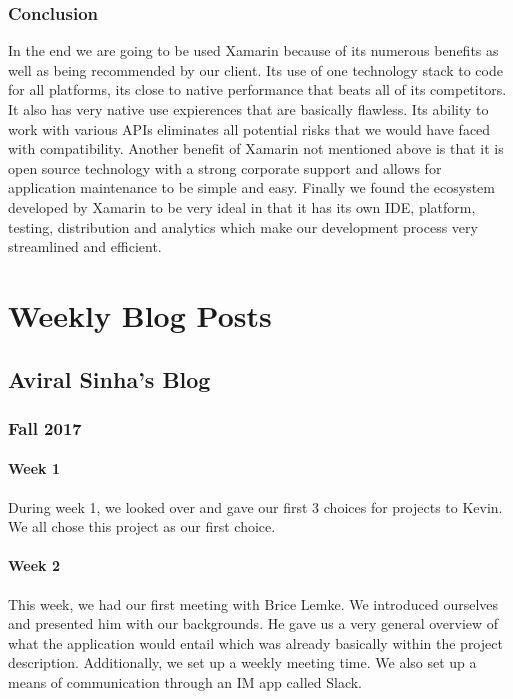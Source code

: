 \documentclass[onecolumn, draftclsnofoot,10pt, compsoc]{IEEEtran}
\begin{document}
\subsubsection{Conclusion}
In the end we are going to be used Xamarin because of its numerous benefits as well as being recommended by our client. Its use of one technology stack to code for all platforms, its close to native performance that beats all of its competitors. It also has very native use expierences that are basically flawless. Its ability to work with various APIs eliminates all potential risks that we would have faced with compatibility. Another benefit of Xamarin not mentioned above is that it is open source technology with a strong corporate support and allows for application maintenance to be simple and easy. Finally we found the ecosystem developed by Xamarin to be very ideal in that it has its own IDE, platform, testing, distribution and analytics which make our development process very streamlined and efficient. 






\newpage




\section{Weekly Blog Posts} 
\subsection{Aviral Sinha's Blog}
\subsubsection{Fall 2017} 
 \paragraph{Week 1}
    During week 1, we looked over and gave our first 3 choices for projects to Kevin. We all chose this project as our first choice. 
    
    \paragraph{Week 2}
    This week, we had our first meeting with Brice Lemke. We introduced ourselves and presented him with our backgrounds. He gave us a very general overview of what the application would entail which was already basically within the project description. Additionally, we set up a weekly meeting time. We also set up a means of communication through an IM app called Slack.
    
\end{document}
